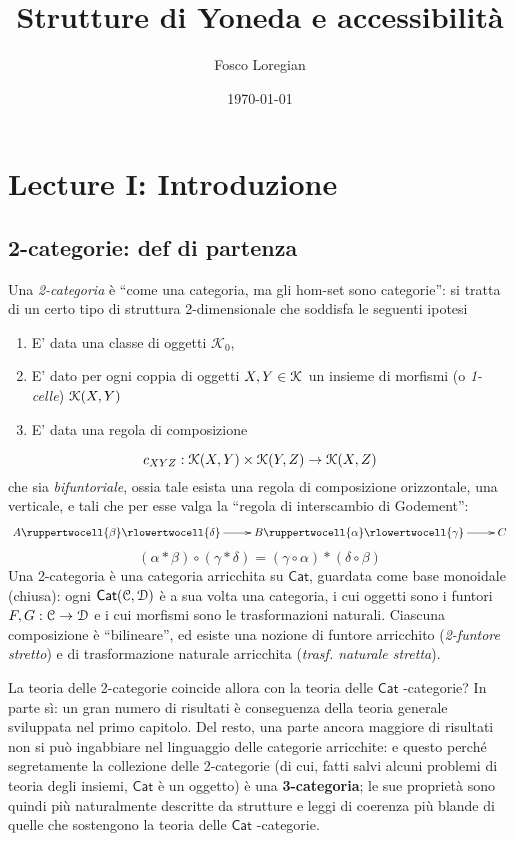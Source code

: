 \documentclass[11pt]{article}
\author{Fosco Loregian}
\date{\today}
\title{Strutture di Yoneda e accessibilità}
\def\C{\mathcal{C}}
\def\Cat{\mathsf{Cat}}
\theoremstyle{reference}
\begin{document}
\maketitle
\tableofcontents



\section{Lecture I: Introduzione}
\label{sec:orgc8f0fd2}
\subsection{2-categorie: def di partenza}
\label{sec:orgc90b0b0}
Una \emph{2-categoria} è ``come una categoria, ma gli hom-set
sono categorie'': si tratta di un certo tipo di struttura
2-dimensionale che soddisfa le seguenti ipotesi

\begin{enumerate}
\item E' data una classe di oggetti \(\mathcal K_0\),
\item E' dato per ogni coppia di oggetti \(X,Y\in \cal K_0\) un
insieme di morfismi (o \emph{1-celle}) \({\cal K}(X,Y)\)
\item E' data una regola di composizione
\end{enumerate}
$$ c_{XYZ} : {\cal K}(X,Y)\times {\cal K}(Y,Z) \to {\cal
K}(X,Z) $$ che sia \emph{bifuntoriale}, ossia tale esista una
regola di composizione orizzontale, una verticale, e tali
che per esse valga la ``regola di interscambio di
Godement'': $$ \xymatrix{A \ruppertwocell{\beta}
\ar[r]\rlowertwocell{\delta}& B \ruppertwocell{\alpha}
\ar[r]\rlowertwocell{\gamma}& C} $$ $$ (\alpha *\beta)\circ
(\gamma * \delta) = (\gamma \circ\alpha) * (\delta \circ
\beta)$$ Una 2-categoria è una categoria arricchita su
\(\Cat\), guardata come base monoidale (chiusa): ogni
\(\Cat({\cal C},{\cal D})\) è a sua volta una categoria, i cui
oggetti sono i funtori \(F,G : \C\to {\cal D}\) e i cui
morfismi sono le trasformazioni naturali. Ciascuna
composizione è ``bilineare'', ed esiste una nozione di
funtore arricchito (\emph{2-funtore stretto}) e di trasformazione
naturale arricchita (\emph{trasf. naturale stretta}).

La teoria delle 2-categorie coincide allora con la teoria
delle \(\Cat\) -categorie? In parte sì: un gran numero di
risultati è conseguenza della teoria generale sviluppata nel
primo capitolo. Del resto, una parte ancora maggiore di
risultati non si può ingabbiare nel linguaggio delle
categorie arricchite: e questo perché segretamente la
collezione delle 2-categorie (di cui, fatti salvi alcuni
problemi di teoria degli insiemi, \(\Cat\) è un oggetto) è una
\textbf{3-categoria}; le sue proprietà sono quindi più naturalmente
descritte da strutture e leggi di coerenza più blande di
quelle che sostengono la teoria delle \(\Cat\) -categorie.
\end{document}
